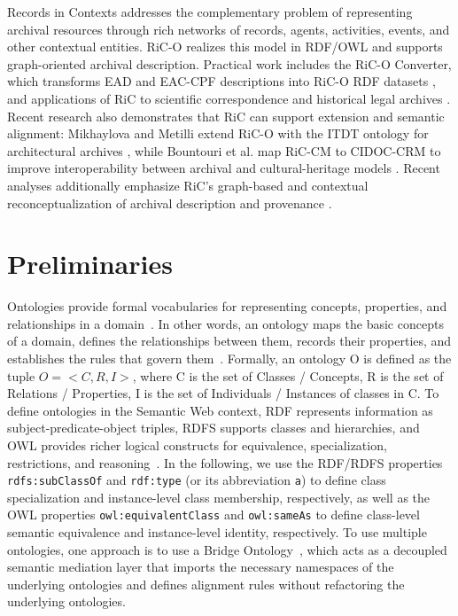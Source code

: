\documentclass[runningheads]{llncs}
\begin{document}
Records in Contexts addresses the complementary problem of representing archival resources through rich networks of records, agents, activities, events, and other contextual entities. RiC-O realizes this model in RDF/OWL and supports graph-oriented archival description. Practical work includes the RiC-O Converter, which transforms EAD and EAC-CPF descriptions into RiC-O RDF datasets \cite{clavaud2023ric}, and applications of RiC to scientific correspondence and historical legal archives \cite{santos2023applying,dimitriou2025describing}. Recent research also demonstrates that RiC can support extension and semantic alignment: Mikhaylova and Metilli extend RiC-O with the ITDT ontology for architectural archives \cite{mikhaylova2023extending}, while Bountouri et al. map RiC-CM to CIDOC-CRM to improve interoperability between archival and cultural-heritage models \cite{bountouri2023semantic}. Recent analyses additionally emphasize RiC's graph-based and contextual reconceptualization of archival description and provenance \cite{stephano2024recontextualization}.


\section{Preliminaries}
\label{sec:preliminaries}
Ontologies provide formal vocabularies for representing concepts, properties, and relationships in a domain~\cite{gruber1993translation}. In other words, an ontology maps the basic concepts of a domain, defines the relationships between them, records their properties, and establishes the rules that govern them~\cite{antoniou_semantic_web_primer_2025}. Formally, an ontology O is defined as the tuple $O=<C, R, I>$, where C is the set of Classes / Concepts, R is the set of Relations / Properties, I is the set of Individuals / Instances of classes in C. 
To define ontologies in the Semantic Web context, RDF
represents information as subject-predicate-object triples, RDFS
supports classes and hierarchies, and OWL
provides richer logical constructs for equivalence, specialization, restrictions, and reasoning~\cite{hendler2020semantic}. In the following, we use the RDF/RDFS properties
\texttt{rdfs:subClassOf} and \texttt{rdf:type} (or its abbreviation \texttt{a}) to define class specialization
and instance-level class membership, respectively, as well as the OWL
properties \texttt{owl:equivalentClass} and \texttt{owl:sameAs} to define
class-level semantic equivalence and instance-level identity, respectively.
To use multiple ontologies, one approach is to use a Bridge Ontology~\cite{kalfoglou2003ontology}, which acts as a decoupled semantic mediation layer that imports the necessary namespaces of the underlying ontologies and defines alignment rules without refactoring the underlying ontologies.
\end{document}
